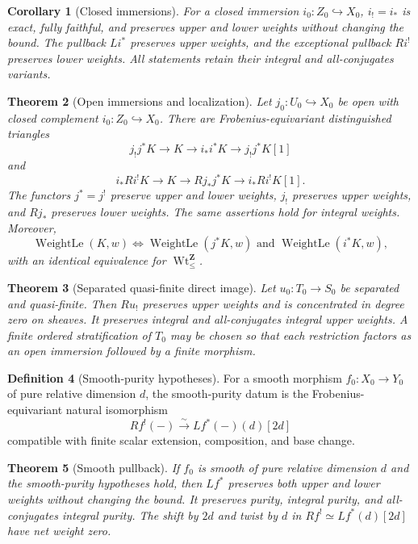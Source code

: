 \documentclass[10pt]{article}
\newtheorem{theorem}{Theorem}[section]
\newtheorem{corollary}[theorem]{Corollary}
\theoremstyle{definition}
\newtheorem{definition}[theorem]{Definition}
\newcommand{\WtLe}{\operatorname{WeightLe}}
\newcommand{\IntWtLe}{\operatorname{Wt}^{\mathbf Z}_{\leq}}
\begin{document}
\begin{corollary}[Closed immersions]
For a closed immersion \(i_0:Z_0\hookrightarrow X_0\),
\(i_!=i_*\) is exact, fully faithful, and preserves upper and lower weights
without changing the bound.  The pullback \(Li^*\) preserves upper weights,
 and the exceptional pullback \(Ri^!\) preserves lower weights.
All statements retain their integral and all-conjugates variants.
\end{corollary}

\begin{theorem}[Open immersions and localization]
Let \(j_0:U_0\hookrightarrow X_0\) be open with closed complement
\(i_0:Z_0\hookrightarrow X_0\).  There are Frobenius-equivariant
distinguished triangles
\[
 j_!j^*K\longrightarrow K\longrightarrow i_*i^*K
                   \longrightarrow j_!j^*K[1]
\]
and
\[
 i_*Ri^!K\longrightarrow K\longrightarrow Rj_*j^*K
                   \longrightarrow i_*Ri^!K[1].
\]
The functors \(j^*=j^!\) preserve upper and lower weights, \(j_!\)
preserves upper weights, and \(Rj_*\) preserves lower weights.  The same
assertions hold for integral weights.  Moreover,
\[
 \WtLe(K,w)\Longleftrightarrow
 \WtLe(j^*K,w)\text{ and }\WtLe(i^*K,w),
\]
with an identical equivalence for \(\IntWtLe\).
\end{theorem}

\begin{theorem}[Separated quasi-finite direct image]
Let \(u_0:T_0\to S_0\) be separated and quasi-finite.  Then \(Ru_!\)
preserves upper weights and is concentrated in degree zero on sheaves.  It
preserves integral and all-conjugates integral upper weights.  A finite
ordered stratification of \(T_0\) may be chosen so that each restriction
factors as an open immersion followed by a finite morphism.
\end{theorem}

\begin{definition}[Smooth-purity hypotheses]
For a smooth morphism \(f_0:X_0\to Y_0\) of pure relative dimension \(d\),
the smooth-purity datum is the Frobenius-equivariant natural isomorphism
\[
                    Rf^!(-)\xrightarrow{\sim}Lf^*(-)(d)[2d]
\]
compatible with finite scalar extension, composition, and base change.
\end{definition}

\begin{theorem}[Smooth pullback]
If \(f_0\) is smooth of pure relative dimension \(d\) and the smooth-purity
hypotheses hold, then \(Lf^*\) preserves both upper and lower weights
without changing the bound.  It preserves purity, integral purity, and
all-conjugates integral purity.  The shift by \(2d\) and twist by \(d\) in
\(Rf^!\simeq Lf^*(d)[2d]\) have net weight zero.
\end{theorem}
\end{document}
